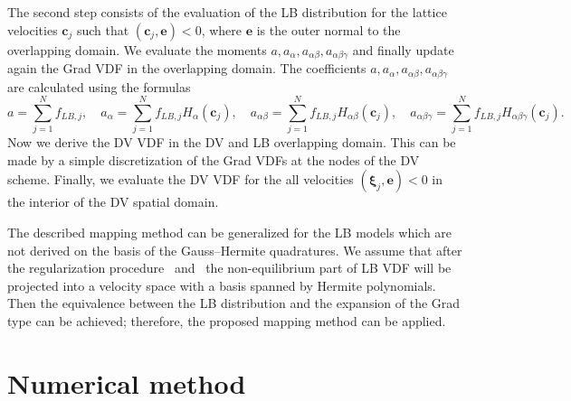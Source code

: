 \documentclass[]{elsarticle} %
\newcommand{\Set}[2]{\{\,{#1}:{#2}\,\}}
\newcommand{\bxi}{\boldsymbol{\xi}}
\newcommand{\bc}{\boldsymbol{c}}
\newcommand{\ai}{a_{\alpha}}
\newcommand{\aij}{a_{\alpha\beta}}
\newcommand{\aijk}{a_{\alpha\beta\gamma}}
\newcommand{\Hi}{H_{\alpha}}
\newcommand{\Hij}{H_{\alpha\beta}}
\newcommand{\Hijk}{H_{\alpha\beta\gamma}}
\begin{document}
The second step consists of the evaluation of the LB   distribution for the lattice velocities $\bc_j$ such that $(\bc_j,\mathbf{e})<0$, where $\mathbf{e}$ is the outer normal to the overlapping domain.
We evaluate the moments $a,\ai,\aij,
\aijk$ and finally update again the Grad VDF in the overlapping domain.
The coefficients $a,\ai,\aij, \aijk$ are calculated using the formulas
\begin{equation}
a=\sum_{j=1}^N f_{LB,j}, \quad \ai=\sum_{j=1}^N f_{LB,j}\Hi(\bc_j), \quad \aij=\sum_{j=1}^N f_{LB,j}\Hij(\bc_j),
\quad \aijk=\sum_{j=1}^N f_{LB,j}\Hijk(\bc_j).
\end{equation}
Now we  derive the DV VDF in the DV and LB overlapping domain. This can be made by a simple
discretization of the Grad VDFs at the nodes of the DV scheme.
Finally, we evaluate the DV VDF for the all velocities $(\bxi_j,\mathbf{e}) <0$
in the interior of the DV spatial domain.

The described mapping method can be generalized for the LB models which are not derived on the basis of the Gauss--Hermite quadratures.
We assume that after the regularization procedure~\cite{Latt2006, Chen2006} and~\cite{Zhang2006, Mont2015, Mattila2017}
the non-equilibrium part of LB VDF will be projected into a velocity space with a basis spanned by Hermite polynomials.
Then the equivalence between the LB distribution and the expansion of the Grad type can be achieved;
therefore, the proposed mapping method can be applied.

\section{Numerical method}\label{sec:numerics}


\end{document}
